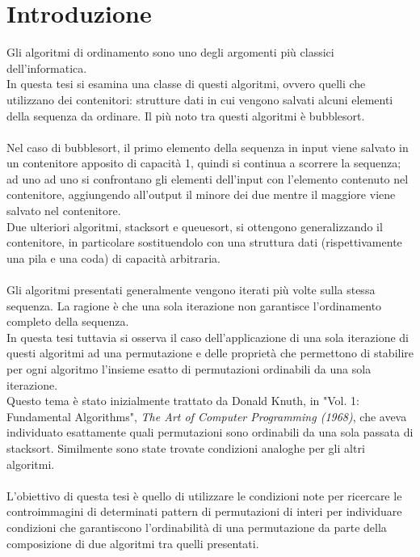 \chapter{Introduzione}
Gli algoritmi di ordinamento sono uno degli argomenti pi\`u classici dell'informatica.\\
In questa tesi si esamina una classe di questi algoritmi, ovvero quelli che utilizzano dei contenitori: strutture dati in cui vengono salvati alcuni elementi della sequenza da ordinare. Il pi\`u noto tra questi algoritmi \`e bubblesort.\\\\
Nel caso di bubblesort, il primo elemento della sequenza in input viene salvato in un contenitore apposito di capacit\`a 1, quindi si continua a scorrere la sequenza; ad uno ad uno  si confrontano gli elementi dell'input con l'elemento contenuto nel contenitore, aggiungendo all'output il minore dei due mentre il maggiore viene salvato nel contenitore.\\
Due ulteriori algoritmi, stacksort e queuesort, si ottengono generalizzando il contenitore, in particolare sostituendolo con una struttura dati (rispettivamente una pila e una coda) di capacit\`a arbitraria.\\\\
Gli algoritmi presentati generalmente vengono iterati pi\`u volte sulla stessa sequenza. La ragione \`e che una sola iterazione non garantisce l'ordinamento completo della sequenza.\\
In questa tesi tuttavia si osserva il caso dell'applicazione di una sola iterazione di questi algoritmi ad una permutazione e delle propriet\`a che permettono di stabilire per ogni algoritmo l'insieme esatto di permutazioni ordinabili da una sola iterazione.\\
Questo tema \`e stato inizialmente trattato da Donald Knuth, in "Vol. 1: Fundamental Algorithms", \textit{The Art of Computer Programming (1968)}, che aveva individuato esattamente quali permutazioni sono ordinabili da una sola passata di stacksort. Similmente sono state trovate condizioni analoghe per gli altri algoritmi.\\\\
L'obiettivo di questa tesi \`e quello di utilizzare le condizioni note per ricercare le controimmagini di determinati pattern di permutazioni di interi per individuare condizioni che garantiscono l'ordinabilit\`a di una permutazione da parte della composizione di due algoritmi tra quelli presentati.\\\\

